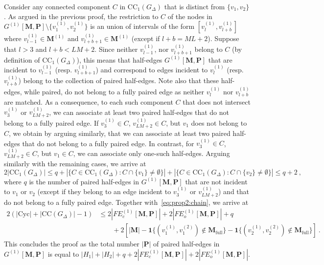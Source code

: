 \documentclass{article}
\begin{document}
Consider any connected component $C$ in $\mathrm{CC}_1(G_{\Delta})$ that is distinct from $\{v_1,v_2\}$. As argued in the previous proof, the restriction to $C$ of the nodes in $G^{(1)}[\mathbf{M},\mathbf{P}]\setminus\{v_1^{(1)},v_2^{(1)}\}$ is an union of intervals of the form $[v^{(1)}_l,v^{(1)}_{l+b}]$ where $v^{(1)}_{l-1}\in \mathbf{M}^{(1)}$ and $v^{(1)}_{l+b+1}\in  \mathbf{M}^{(1)}$ (except if $l+b=ML+2$). Suppose that $l>3$ and $l+b< LM+2$. Since neither $v^{(1)}_{l-1}$, nor $v^{(1)}_{l+b+1}$ belong to $C$ (by definition of $\mathrm{CC}_1(G_{\Delta})$), this means that half-edges $G^{(1)}[\mathbf{M},\mathbf{P}]$ that are incident to $v^{(1)}_{l-1}$ (resp. $v_{l+b+1}^{(1)}$) and correspond to edges incident to $v^{(1)}_{l}$ (resp. $v_{l+b}^{(1)}$) belong to the collection of paired half-edges. Note also that these half-edges, while paired,  do not belong to a fully paired edge as neither $v_l^{(1)}$ nor $v_{l+b}^{(1)}$ are matched. As a consequence, to each such component $C$ that does not intersect $v^{(1)}_{3}$ or $v^{(1)}_{LM+2}$, we can associate at least two paired half-edges that do not belong to a fully paired edge. If $v^{(1)}_3\in C$, $v^{(1)}_{LM+2}\in C$, but $v_1$ does not belong to $C$, we obtain by arguing similarly, that we can associate at least two paired half-edges that do not belong to a fully paired edge. In contrast, for $v^{(1)}_3\in C$, $v^{(1)}_{LM+2}\in C$, but $v_1\in C$, we can associate only one-such half-edges. Arguing similarly with the remaining cases, we arrive at 
\begin{equation}\label{eq:upper:CC1:bis}
    2|\mathrm{CC}_{1}(G_{\Delta})|  \leq q + |\{C\in \mathrm{CC}_{1}(G_{\Delta}): C\cap \{v_1\}\neq \emptyset\}|+ |\{C\in \mathrm{CC}_{1}(G_{\Delta}): C\cap \{v_2\}\neq \emptyset\}|\leq q +2 \ , 
\end{equation}
where $q$ is the number of paired half-edges in $G^{(1)}[\mathbf{M},\mathbf{P}]$ that are not incident to $v_1$ or $v_2$ (except if they belong to an edge incident to $v_3^{(1)}$ or $v_{LM+2}^{(1)}$) and that do not belong to a fully paired edge. Together with~\eqref{eq:prop2:chain}, we arrive at 
\begin{align*}
    2(|\mathrm{Cyc}| + |\mathrm{CC}(G_{\Delta})|-1)  &\leq 2|FE_c^{(1)}[\mathbf{M},\mathbf{P}]|+ 2|FE_o^{(1)}[\mathbf{M},\mathbf{P}]|+ q \\ & \quad \quad + 2\left[|\mathbf{M}|-\mathbf{1}\{(v^{(1)}_1,v^{(2)}_1)\notin \mathbf{M}_{\mathrm{full}}\} -\mathbf{1}\{(v^{(1)}_2,v^{(2)}_2) \notin \mathbf{M}_{\mathrm{full}}\}\right] \ .
\end{align*}
This concludes the proof as the total number  $|\mathbf{P}|$ of paired half-edges in $G^{(1)}[\mathbf{M},\mathbf{P}]$ is equal to $|H_1|+|H_2|+ q + 2|FE_c^{(1)}[\mathbf{M},\mathbf{P}]|+ 2|FE_o^{(1)}[\mathbf{M},\mathbf{P}]|$. 
\end{document}
